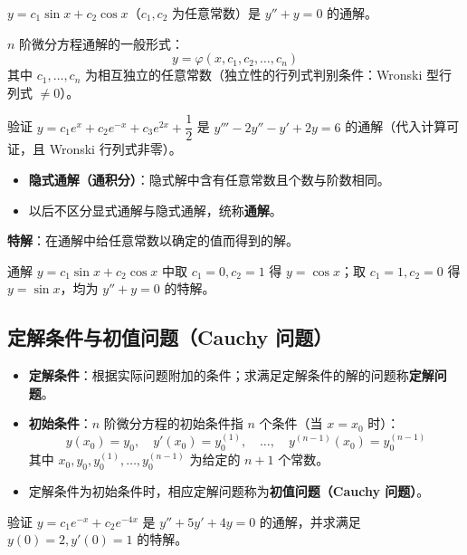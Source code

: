 \begin{example}
$y = c_1 \sin x + c_2 \cos x$（$c_1, c_2$ 为任意常数）是 $y'' + y = 0$ 的通解。
\end{example}

$n$ 阶微分方程通解的一般形式：
$$y = \varphi(x, c_1, c_2, \ldots, c_n)$$
其中 $c_1, \ldots, c_n$ 为相互独立的任意常数（独立性的行列式判别条件：Wronski 型行列式 $\neq 0$）。

\begin{example}
验证 $y = c_1 e^x + c_2 e^{-x} + c_3 e^{2x} + \dfrac{1}{2}$ 是 $y''' - 2y'' - y' + 2y = 6$ 的通解（代入计算可证，且 Wronski 行列式非零）。
\end{example}

\begin{itemize}
    \item \textbf{隐式通解（通积分）}：隐式解中含有任意常数且个数与阶数相同。
    \item 以后不区分显式通解与隐式通解，统称\textbf{通解}。
\end{itemize}

\textbf{特解}：在通解中给任意常数以确定的值而得到的解。

\begin{example}
通解 $y = c_1 \sin x + c_2 \cos x$ 中取 $c_1 = 0, c_2 = 1$ 得 $y = \cos x$；取 $c_1 = 1, c_2 = 0$ 得 $y = \sin x$，均为 $y'' + y = 0$ 的特解。
\end{example}

\subsection{定解条件与初值问题（Cauchy 问题）}

\begin{itemize}
    \item \textbf{定解条件}：根据实际问题附加的条件；求满足定解条件的解的问题称\textbf{定解问题}。
    \item \textbf{初始条件}：$n$ 阶微分方程的初始条件指 $n$ 个条件（当 $x = x_0$ 时）：
    $$y(x_0) = y_0, \quad y'(x_0) = y_0^{(1)}, \quad \ldots, \quad y^{(n-1)}(x_0) = y_0^{(n-1)}$$
    其中 $x_0, y_0, y_0^{(1)}, \ldots, y_0^{(n-1)}$ 为给定的 $n+1$ 个常数。
    \item 定解条件为初始条件时，相应定解问题称为\textbf{初值问题（Cauchy 问题）}。
\end{itemize}

\begin{example}
验证 $y = c_1 e^{-x} + c_2 e^{-4x}$ 是 $y'' + 5y' + 4y = 0$ 的通解，并求满足 $y(0) = 2, y'(0) = 1$ 的特解。
\end{example}

